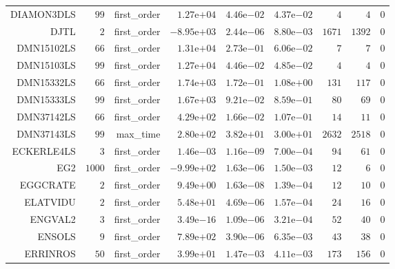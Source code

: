 \begin{longtable}{rrrrrrrrr}
DIAMON3DLS & \(    99\) & first\_order & \( 1.27\)e\(+04\) & \( 4.46\)e\(-02\) & \( 4.37\)e\(-02\) & \(     4\) & \(     4\) & \(     0\) \\
DJTL & \(     2\) & first\_order & \(-8.95\)e\(+03\) & \( 2.44\)e\(-06\) & \( 8.80\)e\(-03\) & \(  1671\) & \(  1392\) & \(     0\) \\
DMN15102LS & \(    66\) & first\_order & \( 1.31\)e\(+04\) & \( 2.73\)e\(-01\) & \( 6.06\)e\(-02\) & \(     7\) & \(     7\) & \(     0\) \\
DMN15103LS & \(    99\) & first\_order & \( 1.27\)e\(+04\) & \( 4.46\)e\(-02\) & \( 4.85\)e\(-02\) & \(     4\) & \(     4\) & \(     0\) \\
DMN15332LS & \(    66\) & first\_order & \( 1.74\)e\(+03\) & \( 1.72\)e\(-01\) & \( 1.08\)e\(+00\) & \(   131\) & \(   117\) & \(     0\) \\
DMN15333LS & \(    99\) & first\_order & \( 1.67\)e\(+03\) & \( 9.21\)e\(-02\) & \( 8.59\)e\(-01\) & \(    80\) & \(    69\) & \(     0\) \\
DMN37142LS & \(    66\) & first\_order & \( 4.29\)e\(+02\) & \( 1.66\)e\(-02\) & \( 1.07\)e\(-01\) & \(    14\) & \(    11\) & \(     0\) \\
DMN37143LS & \(    99\) & max\_time & \( 2.80\)e\(+02\) & \( 3.82\)e\(+01\) & \( 3.00\)e\(+01\) & \(  2632\) & \(  2518\) & \(     0\) \\
ECKERLE4LS & \(     3\) & first\_order & \( 1.46\)e\(-03\) & \( 1.16\)e\(-09\) & \( 7.00\)e\(-04\) & \(    94\) & \(    61\) & \(     0\) \\
EG2 & \(  1000\) & first\_order & \(-9.99\)e\(+02\) & \( 1.63\)e\(-06\) & \( 1.50\)e\(-03\) & \(    12\) & \(     6\) & \(     0\) \\
EGGCRATE & \(     2\) & first\_order & \( 9.49\)e\(+00\) & \( 1.63\)e\(-08\) & \( 1.39\)e\(-04\) & \(    12\) & \(    10\) & \(     0\) \\
ELATVIDU & \(     2\) & first\_order & \( 5.48\)e\(+01\) & \( 4.69\)e\(-06\) & \( 1.57\)e\(-04\) & \(    24\) & \(    16\) & \(     0\) \\
ENGVAL2 & \(     3\) & first\_order & \( 3.49\)e\(-16\) & \( 1.09\)e\(-06\) & \( 3.21\)e\(-04\) & \(    52\) & \(    40\) & \(     0\) \\
ENSOLS & \(     9\) & first\_order & \( 7.89\)e\(+02\) & \( 3.90\)e\(-06\) & \( 6.35\)e\(-03\) & \(    43\) & \(    38\) & \(     0\) \\
ERRINROS & \(    50\) & first\_order & \( 3.99\)e\(+01\) & \( 1.47\)e\(-03\) & \( 4.11\)e\(-03\) & \(   173\) & \(   156\) & \(     0\) \\

\end{longtable}
